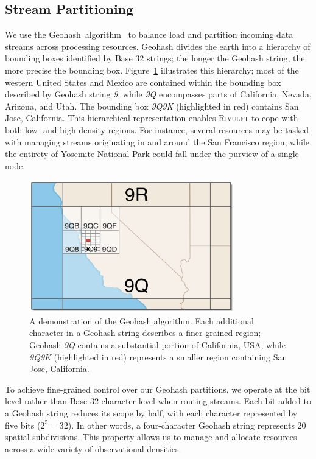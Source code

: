 \subsection{Stream Partitioning}
We use the Geohash~algorithm~\cite{geohash} to balance load and partition incoming data streams across processing resources. Geohash divides the earth into a hierarchy of bounding boxes identified by Base 32 strings; the longer the Geohash string, the more precise the bounding box. Figure~\ref{fig:geohash} illustrates this hierarchy; most of the western United States and Mexico are contained within the bounding box described by Geohash string \emph{9}, while \emph{9Q} encompasses parts of California, Nevada, Arizona, and Utah. The bounding box \emph{9Q9K} (highlighted in red) contains San Jose, California. This hierarchical representation enables \textsc{Rivulet} to cope with both low- and high-density regions. For instance, several resources may be tasked with managing streams originating in and around the San Francisco region, while the entirety of Yosemite National Park could fall under the purview of a single node.

\begin{figure}
    \centerline{\includegraphics[width=3.5in]{figures/geohash.pdf}}
    \caption{A demonstration of the Geohash algorithm. Each additional character in a Geohash string describes a finer-grained region; Geohash \emph{9Q} contains a substantial portion of California, USA, while \emph{9Q9K} (highlighted in red) represents a smaller region containing San Jose, California.}
    \label{fig:geohash}
\end{figure}

To achieve fine-grained control over our Geohash partitions, we operate at the bit level rather than Base 32 character level when routing streams. Each bit added to a Geohash string reduces its scope by half, with each character represented by five bits ($2^5 = 32$). In other words, a four-character Geohash string represents 20 spatial subdivisions. This property allows us to manage and allocate resources across a wide variety of observational densities.

